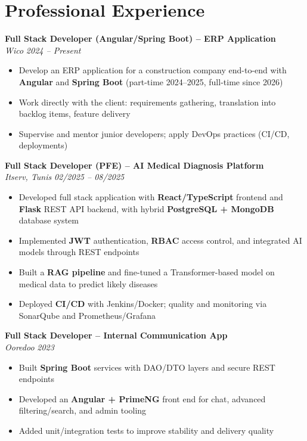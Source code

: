 \documentclass[10pt,a4paper]{article}
\begin{document}
\vspace{6pt}

\section*{Professional Experience}
{\small

\textbf{Full Stack Developer (Angular/Spring Boot) -- ERP Application}\\[1pt]
\textit{Wico} \hfill \textit{2024 -- Present}
\begin{itemize}
  \item Develop an ERP application for a construction company end-to-end with \textbf{Angular} and \textbf{Spring Boot} (part-time 2024--2025, full-time since 2026)
  \item Work directly with the client: requirements gathering, translation into backlog items, feature delivery
  \item Supervise and mentor junior developers; apply DevOps practices (CI/CD, deployments)
\end{itemize}

\vspace{3pt}
\textbf{Full Stack Developer (PFE) -- AI Medical Diagnosis Platform}\\[1pt]
\textit{Itserv, Tunis} \hfill \textit{02/2025 -- 08/2025}
\begin{itemize}
  \item Developed full stack application with \textbf{React/TypeScript} frontend and \textbf{Flask} REST API backend, with hybrid \textbf{PostgreSQL + MongoDB} database system
  \item Implemented \textbf{JWT} authentication, \textbf{RBAC} access control, and integrated AI models through REST endpoints
  \item Built a \textbf{RAG pipeline} and fine-tuned a Transformer-based model on medical data to predict likely diseases
  \item Deployed \textbf{CI/CD} with Jenkins/Docker; quality and monitoring via SonarQube and Prometheus/Grafana
\end{itemize}

\vspace{3pt}
\textbf{Full Stack Developer -- Internal Communication App}\\[1pt]
\textit{Ooredoo} \hfill \textit{2023}
\begin{itemize}
  \item Built \textbf{Spring Boot} services with DAO/DTO layers and secure REST endpoints
  \item Developed an \textbf{Angular + PrimeNG} front end for chat, advanced filtering/search, and admin tooling
  \item Added unit/integration tests to improve stability and delivery quality
\end{itemize}

}
\end{document}
